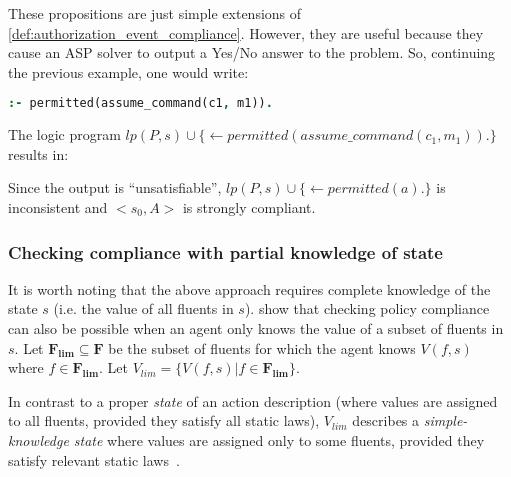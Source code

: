 These propositions are just simple extensions of \cref{def:authorization_event_compliance}.
However, they are useful because they cause an ASP solver to output a Yes/No answer to the problem.
So, continuing the previous example, one would write:
\begin{lstlisting}[language=Prolog]
:- permitted(assume_command(c1, m1)).
\end{lstlisting}
The logic program $lp(P, s) \cup \{ \leftarrow permitted(assume\_command(c_1, m_1)). \}$ results in:

Since the output is ``unsatisfiable'', $lp(P, s) \cup \{ \leftarrow permitted(a). \}$ is inconsistent and $<s_0, A>$ is strongly compliant.

\subsubsection{Checking compliance with partial knowledge of state}

It is worth noting that the above approach requires complete knowledge of the state $s$ (i.e. the value of all fluents in $s$).
\citet{gelfond_authorization_2008} show that checking policy compliance can also be possible when an agent only knows the value of a subset of fluents in $s$.
Let $\boldsymbol{F_{lim}} \subseteq \boldsymbol{F}$ be the subset of fluents for which the agent knows $V(f, s)$ where $f \in \boldsymbol{F_{lim}}$.
Let $V_{lim} = \{V(f, s) | f \in \boldsymbol{F_{lim}}\}$.

\begin{definition}
    \label{def:simple_knowledge_state}
    In contrast to a proper \textit{state} of an action description (where values are assigned to all fluents, provided they satisfy all static laws), $V_{lim}$ describes a \textit{simple-knowledge state} where values are assigned only to some fluents, provided they satisfy relevant static laws~\citep{gelfond_authorization_2008}.
\end{definition}

